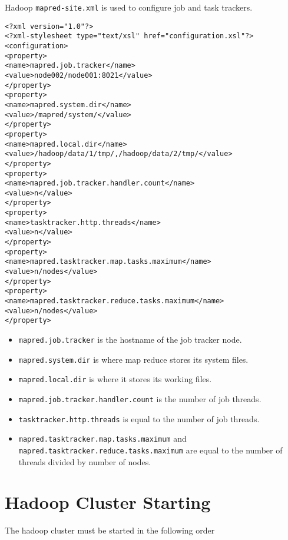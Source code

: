 \documentclass[11pt]{article}
\begin{document}

Hadoop \texttt{mapred-site.xml} is used to configure job and task
trackers.

\begin{verbatim}
<?xml version="1.0"?>
<?xml-stylesheet type="text/xsl" href="configuration.xsl"?>
<configuration>
<property>
<name>mapred.job.tracker</name>
<value>node002/node001:8021</value>
</property>
<property>
<name>mapred.system.dir</name>
<value>/mapred/system/</value>
</property>
<property>
<name>mapred.local.dir</name>
<value>/hadoop/data/1/tmp/,/hadoop/data/2/tmp/</value>
</property>
<property>
<name>mapred.job.tracker.handler.count</name>
<value>n</value>
</property>
<property>
<name>tasktracker.http.threads</name>
<value>n</value>
</property>
<property>
<name>mapred.tasktracker.map.tasks.maximum</name>
<value>n/nodes</value>
</property>
<property>
<name>mapred.tasktracker.reduce.tasks.maximum</name>
<value>n/nodes</value>
</property>
\end{verbatim}

\begin{itemize}
\itemsep1pt\parskip0pt
\item
  \texttt{mapred.job.tracker} is the hostname of the job tracker node.
\item
  \texttt{mapred.system.dir} is where map reduce stores its system
  files.
\item
  \texttt{mapred.local.dir} is where it stores its working files.
\item
  \texttt{mapred.job.tracker.handler.count} is the number of job
  threads.
\item
  \texttt{tasktracker.http.threads} is equal to the number of job
  threads.
\item
  \texttt{mapred.tasktracker.map.tasks.maximum} and
  \texttt{mapred.tasktracker.reduce.tasks.maximum} are equal to the
  number of threads divided by number of nodes.
\end{itemize}

\section{Hadoop Cluster Starting}

The hadoop cluster must be started in the following order
\end{document}
